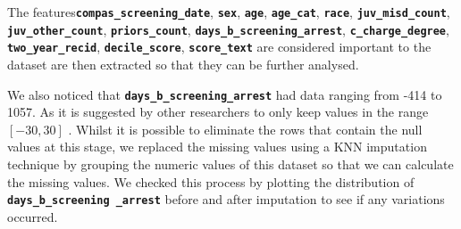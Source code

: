\documentclass[conference]{IEEEtran}
\begin{document}
	\begin{flushleft}
	The features\textbf{\texttt{compas\_screening\_date}}, \textbf{\texttt{sex}}, \textbf{\texttt{age}}, \textbf{\texttt{age\_cat}}, \textbf{\texttt{race}}, \textbf{\texttt{juv\_misd\_count}}, \textbf{\texttt{juv\_other\_count}}, \textbf{\texttt{priors\_count}}, \textbf{\texttt{days\_b\_screening\_arrest}}, \textbf{\texttt{c\_charge\_degree}}, \textbf{\texttt{two\_year\_recid}}, \textbf{\texttt{decile\_score}}, \textbf{\texttt{score\_text}} are considered important to the dataset are then extracted so that they can be further analysed. 
	\end{flushleft}
	
	We also noticed that \textbf{\texttt{days\_b\_screening\_arrest}} had data ranging from -414 to  1057. As it is suggested by other researchers to only keep values in the range $[-30,30]$ \cite{barocas2023fairness}. Whilst it is possible to eliminate the rows that contain the null values at this stage, we replaced the missing values using a KNN imputation technique by grouping the numeric values of this dataset so that we can calculate the missing values. We checked this process by plotting the distribution of \textbf{\texttt{days\_b\_screening \_arrest}}  before and after imputation to see if any variations occurred.
	
	
	
	
\printbibliography
\end{document}
